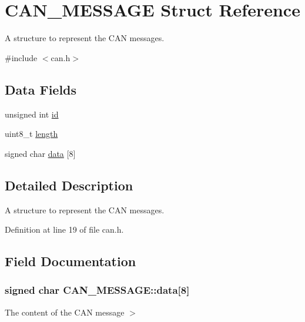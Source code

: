 \hypertarget{structCAN__MESSAGE}{}\section{C\+A\+N\+\_\+\+M\+E\+S\+S\+A\+GE Struct Reference}
\label{structCAN__MESSAGE}


A structure to represent the C\+AN messages.  




{\ttfamily \#include $<$can.\+h$>$}

\subsection*{Data Fields}
\begin{DoxyCompactItemize}
\item 
unsigned int \hyperlink{structCAN__MESSAGE_a5dcbfe2aa7e36c8f3f4f036487ae07ff}{id}
\item 
uint8\+\_\+t \hyperlink{structCAN__MESSAGE_a9f29743aada8d97998cc349d351c0e07}{length}
\item 
signed char \hyperlink{structCAN__MESSAGE_a940c793de402cbc059d24a03363715ee}{data} \mbox{[}8\mbox{]}
\end{DoxyCompactItemize}


\subsection{Detailed Description}
A structure to represent the C\+AN messages. 

Definition at line 19 of file can.\+h.



\subsection{Field Documentation}
\subsubsection[{\texorpdfstring{data}{data}}]{\setlength{\rightskip}{0pt plus 5cm}signed char C\+A\+N\+\_\+\+M\+E\+S\+S\+A\+G\+E\+::data\mbox{[}8\mbox{]}}\hypertarget{structCAN__MESSAGE_a940c793de402cbc059d24a03363715ee}{}\label{structCAN__MESSAGE_a940c793de402cbc059d24a03363715ee}
The content of the C\+AN message $>$ 


